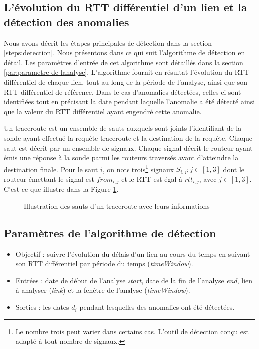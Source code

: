 \subsection{L'évolution du RTT différentiel d'un lien et  la détection des anomalies} \label{rttevolution}

Nous avons décrit les étapes principales de détection dans la section \ref{steps:detection}. Nous  présentons dans ce qui suit  l'algorithme de détection en détail. Les paramètres d'entrée  de cet algorithme sont détaillés dans la section \ref{par:parametre-de-lanalyse}. L'algorithme fournit en résultat l'évolution du RTT différentiel de chaque lien, tout au long de la période de l'analyse, ainsi que son RTT différentiel de référence. Dans le cas d'anomalies détectées, celles-ci sont identifiées tout en précisant la date pendant laquelle l'anomalie a été détecté ainsi que la valeur du RTT différentiel ayant engendré cette anomalie. 

Un traceroute  est un ensemble de sauts auxquels sont joints l'identifiant de la sonde ayant effectué la requête traceroute et la destination de la requête. Chaque saut est décrit par un ensemble de signaux.  Chaque signal décrit le routeur ayant émis une réponse à la sonde parmi les routeurs traversés avant d'atteindre la destination finale.  Pour le saut $i$, on note trois\footnote{Le nombre trois peut varier dans certains cas. L'outil de détection conçu est adapté à tout nombre de signaux.} signaux $S_{i, j}; j\in [1,3]$ dont le routeur émettant le signal est $from_{i,j}$ et le RTT est égal à $rtt_{i,j}$, avec $j \in [1,3]$. C'est ce que   illustre dans la Figure \ref{fig:traceroute}.

\begin{figure}[H]
	\centering
	\captionsetup{justification=centering}
	\resizebox{\textwidth}{!}{
	
}
	\caption{Illustration des sauts d'un traceroute avec leurs informations}
	\label{fig:traceroute}
\end{figure}


\subsection{Paramètres de l'algorithme de  détection}

\begin{itemize}
		\item  Objectif : suivre l'évolution du délais d'un lien au cours du temps en suivant son RTT différentiel par période du temps (\textit{timeWindow}).
	\item Entrées : date de début de l'analyse \textit{start}, date de la fin de l'analyse \textit{end}, lien à analyser (\textit{link}) et la fenêtre de l'analyse (\textit{timeWindow}).
	\item Sorties : les dates $d_i$ pendant lesquelles des anomalies ont été détectées.
\end{itemize}


